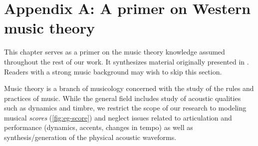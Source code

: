 \chapter{Appendix A: A primer on Western music theory}\label{sec:music-theory-primer}

\ifpdf
    \graphicspath{{Appendix1/Figs/Raster/}{Appendix1/Figs/PDF/}{Appendix1/Figs/}}
\else
    \graphicspath{{Appendix1/Figs/Vector/}{Appendix1/Figs/}}
\fi

This chapter serves as a primer on the music theory knowledge assumed
throughout the rest of our work. It synthesizes material originally presented
in
\citet{franklin2006recurrent,nagler2014schubot,quick2014kulitta,freedman2015correlational}.
Readers with a strong music background may wish to skip this section.

Music theory is a branch of musicology concerned with the study of the rules
and practices of music. While the general field includes study of acoustic
qualities such as dynamics and timbre, we restrict the scope of our research to
modeling musical \emph{scores} (\eg \cref{fig:eg-score}) and neglect issues
related to articulation and performance (\eg dynamics, accents, changes in
tempo) as well as synthesis/generation of the physical acoustic waveforms.

